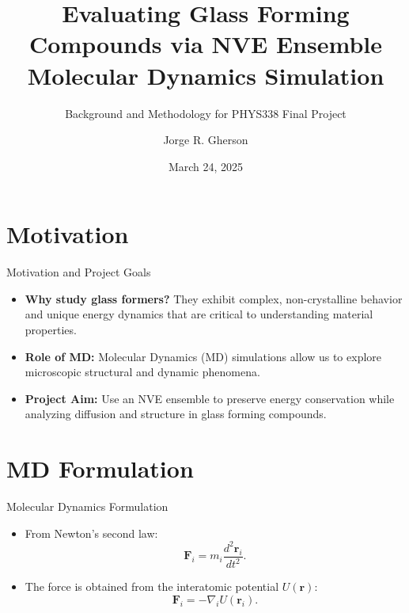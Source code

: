 \documentclass{beamer}
\title{Evaluating Glass Forming Compounds via NVE Ensemble Molecular Dynamics Simulation}
\subtitle{Background and Methodology for PHYS338 Final Project}
\author{Jorge R. Gherson}
\date{March 24, 2025}
\begin{document}
\begin{frame}
  \titlepage
\end{frame}

\section{Motivation}
\begin{frame}{Motivation and Project Goals}
  \begin{itemize}
    \item \textbf{Why study glass formers?} They exhibit complex, non-crystalline behavior and unique energy dynamics that are critical to understanding material properties.
    \item \textbf{Role of MD:} Molecular Dynamics (MD) simulations allow us to explore microscopic structural and dynamic phenomena.
    \item \textbf{Project Aim:} Use an NVE ensemble to preserve energy conservation while analyzing diffusion and structure in glass forming compounds.
  \end{itemize}
\end{frame}

\section{MD Formulation}
\begin{frame}{Molecular Dynamics Formulation}
  \begin{itemize}
    \item From Newton's second law:
      \[
      \mathbf{F}_i = m_i \frac{d^2 \mathbf{r}_i}{dt^2}.
      \]
    \item The force is obtained from the interatomic potential \(U(\mathbf{r})\):
      \[
      \mathbf{F}_i = -\nabla_i U(\mathbf{r}_i).
      \]
  \end{itemize}
\end{frame}

\end{document}
